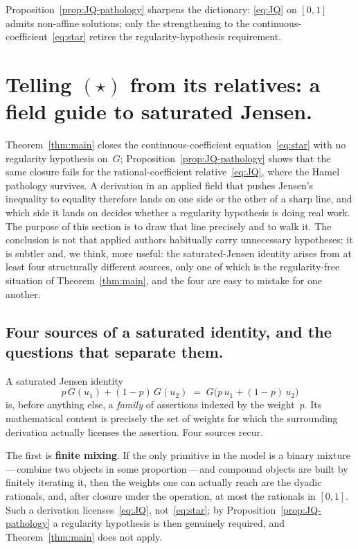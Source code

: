 \documentclass{article}
\theoremstyle{plain}
\theoremstyle{definition}
\begin{document}
Proposition~\ref{prop:JQ-pathology} sharpens the dictionary:
\eqref{eq:JQ} on $[0,1]$ admits non-affine solutions; only the
strengthening to the continuous-coefficient~\eqref{eq:star} retires the
regularity-hypothesis requirement.

\section{Telling $(\star)$ from its relatives: a field guide to saturated Jensen.}
\label{sec:recurrence}

Theorem~\ref{thm:main} closes the continuous-coefficient
equation~\eqref{eq:star} with no regularity hypothesis on~$G$;
Proposition~\ref{prop:JQ-pathology} shows that the same closure fails
for the rational-coefficient relative~\eqref{eq:JQ}, where the Hamel
pathology survives. A derivation in an applied field that pushes
Jensen's inequality to equality therefore lands on one side or the
other of a sharp line, and which side it lands on decides whether a
regularity hypothesis is doing real work. The purpose of this section
is to draw that line precisely and to walk it. The conclusion is not
that applied authors habitually carry unnecessary hypotheses; it is
subtler and, we think, more useful: the saturated-Jensen identity
arises from at least four structurally different sources, only one of
which is the regularity-free situation of Theorem~\ref{thm:main}, and
the four are easy to mistake for one another.

\subsection{Four sources of a saturated identity, and the questions that separate them.}
\label{ssec:diagnostic}

A saturated Jensen identity
\[
p\,G(u_1)+(1-p)\,G(u_2)\;=\;G\bigl(p\,u_1+(1-p)\,u_2\bigr)
\]
is, before anything else, a \emph{family} of assertions indexed by the
weight~$p$. Its mathematical content is precisely the set of weights
for which the surrounding derivation actually licenses the assertion.
Four sources recur.

The first is \textbf{finite mixing}. If the only primitive in the
model is a binary mixture\,---\,combine two objects in some
proportion\,---\,and compound objects are built by finitely iterating
it, then the weights one can actually reach are the dyadic rationals,
and, after closure under the operation, at most the rationals in
$[0,1]$. Such a derivation licenses~\eqref{eq:JQ}, not~\eqref{eq:star};
by Proposition~\ref{prop:JQ-pathology} a regularity hypothesis is then
genuinely required, and Theorem~\ref{thm:main} does not apply.
\end{document}
